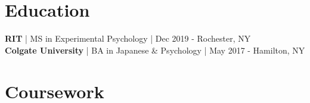 \documentclass[letterpaper]{deedy-resume_sm} %
\begin{document}


\section{Education} 
\textbf{RIT} | MS in Experimental Psychology | Dec 2019 - Rochester, NY\\
\textbf{Colgate University} | BA in Japanese \& Psychology | May 2017 - Hamilton, NY\\

\section{Coursework}
\end{document}
